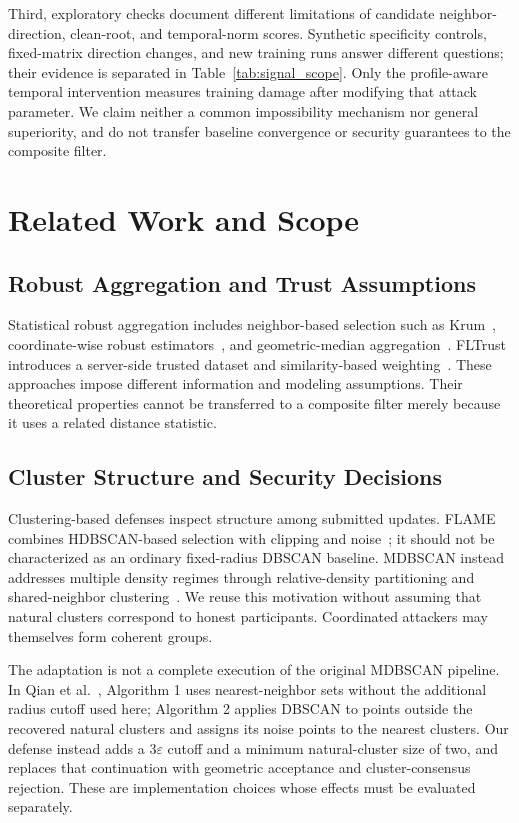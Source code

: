 \documentclass[journal]{IEEEtran}
\begin{document}
Third, exploratory checks document different limitations of candidate neighbor-direction, clean-root, and temporal-norm scores. Synthetic specificity controls, fixed-matrix direction changes, and new training runs answer different questions; their evidence is separated in Table~\ref{tab:signal_scope}. Only the profile-aware temporal intervention measures training damage after modifying that attack parameter. We claim neither a common impossibility mechanism nor general superiority, and do not transfer baseline convergence or security guarantees to the composite filter.

\section{Related Work and Scope}
\subsection{Robust Aggregation and Trust Assumptions}
Statistical robust aggregation includes neighbor-based selection such as Krum~\cite{blanchard2017}, coordinate-wise robust estimators~\cite{yin2018}, and geometric-median aggregation~\cite{pillutla2022rfa}. FLTrust introduces a server-side trusted dataset and similarity-based weighting~\cite{cao2021fltrust}. These approaches impose different information and modeling assumptions. Their theoretical properties cannot be transferred to a composite filter merely because it uses a related distance statistic.

\subsection{Cluster Structure and Security Decisions}
Clustering-based defenses inspect structure among submitted updates. FLAME combines HDBSCAN-based selection with clipping and noise~\cite{nguyen2022flame}; it should not be characterized as an ordinary fixed-radius DBSCAN baseline. MDBSCAN instead addresses multiple density regimes through relative-density partitioning and shared-neighbor clustering~\cite{qian2024mdbscan}. We reuse this motivation without assuming that natural clusters correspond to honest participants. Coordinated attackers may themselves form coherent groups.

The adaptation is not a complete execution of the original MDBSCAN pipeline. In Qian et al.~\cite{qian2024mdbscan}, Algorithm 1 uses nearest-neighbor sets without the additional radius cutoff used here; Algorithm 2 applies DBSCAN to points outside the recovered natural clusters and assigns its noise points to the nearest clusters. Our defense instead adds a $3\varepsilon$ cutoff and a minimum natural-cluster size of two, and replaces that continuation with geometric acceptance and cluster-consensus rejection. These are implementation choices whose effects must be evaluated separately.
\end{document}
